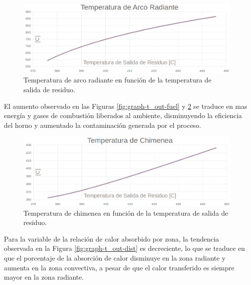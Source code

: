 \begin{figure}[H]\begin{center}
\includegraphics[scale=0.46]{images/graph-t_out-arc}
\caption[Temperatura de arco radiante en función de Temperatura de salida de residuo]{Temperatura de arco radiante en función de la temperatura de salida de residuo.}
\label{fig:graph-t_out-arc}\end{center}\end{figure}
\par El aumento observado en las Figuras \ref{fig:graph-t_out-fuel} y \ref{fig:graph-t_out-chim} se traduce en mas energía y gases de combustión liberados al ambiente, disminuyendo la eficiencia del horno y aumentado la contaminación generada por el proceso.
\begin{figure}[H]\begin{center}
\includegraphics[scale=0.46]{images/graph-t_out-chim}
\caption[Temperatura de chimenea en función de Temperatura de salida de residuo]{Temperatura de chimenea en función de la temperatura de salida de residuo.}
\label{fig:graph-t_out-chim}\end{center}\end{figure}
\par Para la variable de la relación de calor absorbido por zona, la tendencia observada en la Figura \ref{fig:graph-t_out-dist} es decreciente, lo que se traduce en que el porcentaje de la absorción de calor disminuye en la zona radiante y aumenta en la zona convectiva, a pesar de que el calor transferido es siempre mayor en la zona radiante.
